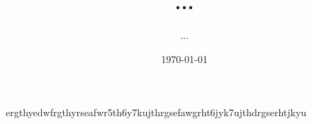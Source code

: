 \documentclass{article}
\begin{document}
\title{...}
\author{...}
\date{\today}


ergthyedwfrgthyrseafwr5th6y7kujthrgsefawgrht6jyk7ujthdrgserhtjkyu
\end{document}
